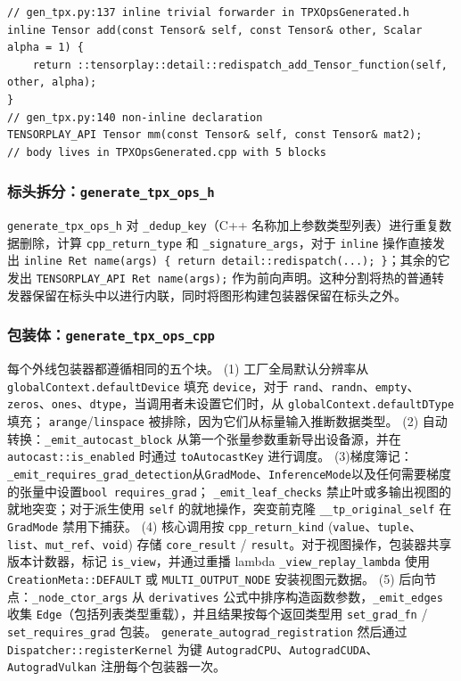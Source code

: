 \begin{lstlisting}[caption={Inline vs.\ non-inline emission.}, label=lst:tpxinline, style=cppstyle]
// gen_tpx.py:137 inline trivial forwarder in TPXOpsGenerated.h
inline Tensor add(const Tensor& self, const Tensor& other, Scalar alpha = 1) {
    return ::tensorplay::detail::redispatch_add_Tensor_function(self, other, alpha);
}
// gen_tpx.py:140 non-inline declaration
TENSORPLAY_API Tensor mm(const Tensor& self, const Tensor& mat2);
// body lives in TPXOpsGenerated.cpp with 5 blocks
\end{lstlisting}

\subsubsection{标头拆分：\texttt{generate\_tpx\_ops\_h}}

\texttt{generate\_tpx\_ops\_h} 对 \texttt{\_dedup\_key}（C++ 名称加上参数类型列表）进行重复数据删除，计算 \texttt{cpp\_return\_type} 和 \texttt{\_signature\_args}，对于 \texttt{inline} 操作直接发出 \texttt{inline Ret name(args) \{ return detail::redispatch(...); \}}；其余的它发出 \texttt{TENSORPLAY\_API Ret name(args);} 作为前向声明。这种分割将热的普通转发器保留在标头中以进行内联，同时将图形构建包装器保留在标头之外。

\subsubsection{包装体：\texttt{generate\_tpx\_ops\_cpp}}

每个外线包装器都遵循相同的五个块。 (1) 工厂全局默认分辨率从 \texttt{globalContext.defaultDevice} 填充 \texttt{device}，对于 \texttt{rand}、\texttt{randn}、\texttt{empty}、\texttt{zeros}、\texttt{ones}、\texttt{dtype}，当调用者未设置它们时，从 \texttt{globalContext.defaultDType} 填充； \texttt{arange}/\texttt{linspace} 被排除，因为它们从标量输入推断数据类型。 (2) 自动转换：\texttt{\_emit\_autocast\_block} 从第一个张量参数重新导出设备源，并在 \texttt{autocast::is\_enabled} 时通过 \texttt{toAutocastKey} 进行调度。 (3)梯度簿记：\texttt{\_emit\_requires\_grad\_detection}从\texttt{GradMode}、\texttt{InferenceMode}以及任何需要梯度的张量中设置\texttt{bool requires\_grad}； \texttt{\_emit\_leaf\_checks} 禁止叶或多输出视图的就地突变；对于派生使用 \texttt{self} 的就地操作，突变前克隆 \texttt{\_\_tp\_original\_self} 在 \texttt{GradMode} 禁用下捕获。 (4) 核心调用按 \texttt{cpp\_return\_kind} (\texttt{value}、\texttt{tuple}、\texttt{list}、\texttt{mut\_ref}、\texttt{void}) 存储 \texttt{core\_result} / \texttt{result}。对于视图操作，包装器共享版本计数器，标记 \texttt{is\_view}，并通过重播 lambda \texttt{\_view\_replay\_lambda} 使用 \texttt{CreationMeta::DEFAULT} 或 \texttt{MULTI\_OUTPUT\_NODE} 安装视图元数据。 (5) 后向节点：\texttt{\_node\_ctor\_args} 从 \texttt{derivatives} 公式中排序构造函数参数，\texttt{\_emit\_edges} 收集 \texttt{Edge}（包括列表类型重载），并且结果按每个返回类型用 \texttt{set\_grad\_fn} / \texttt{set\_requires\_grad} 包装。 \texttt{generate\_autograd\_registration} 然后通过 \texttt{Dispatcher::registerKernel} 为键 \texttt{AutogradCPU}、\texttt{AutogradCUDA}、\texttt{AutogradVulkan} 注册每个包装器一次。

